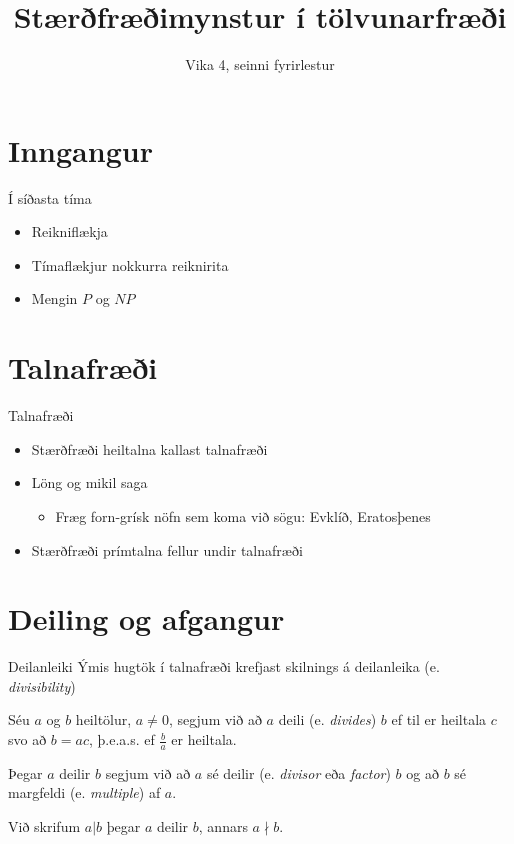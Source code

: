 \documentclass[handout]{beamer}
\title{Stærðfræðimynstur í tölvunarfræði}
\subtitle{Vika 4, seinni fyrirlestur}
\begin{document}
\begin{frame}
\titlepage
\end{frame}


\section{Inngangur}

\begin{frame}{Í síðasta tíma}
\begin{itemize}
 \item Reikniflækja
 \item Tímaflækjur nokkurra reiknirita
 \item Mengin $P$ og $NP$
\end{itemize}
\end{frame}

\section{Talnafræði}

\begin{frame}{Talnafræði}
\begin{itemize}
 \item Stærðfræði heiltalna kallast talnafræði
 \item Löng og mikil saga
 \begin{itemize}
  \item Fræg forn-grísk nöfn sem koma við sögu: Evklíð, Eratosþenes
 \end{itemize}
 \item Stærðfræði prímtalna fellur undir talnafræði
\end{itemize}
\end{frame}

\section{Deiling og afgangur}

\begin{frame}{Deilanleiki}
Ýmis hugtök í talnafræði krefjast skilnings á deilanleika (e. \emph{divisibility})

\begin{tcolorbox}[title=Deilanleiki]
Séu $a$ og $b$ heiltölur, $a \neq 0$, segjum við að $a$ deili (e. \emph{divides}) $b$ ef til er heiltala $c$ svo að $b = ac$, þ.e.a.s. ef $\frac{b}{a}$ er heiltala.

Þegar $a$ deilir $b$ segjum við að $a$ sé deilir (e. \emph{divisor} eða \emph{factor}) $b$ og að $b$ sé margfeldi (e. \emph{multiple}) af $a$.

Við skrifum $a | b$ þegar $a$ deilir $b$, annars $a \nmid b$.
\end{tcolorbox}
\end{frame}
\end{document}
